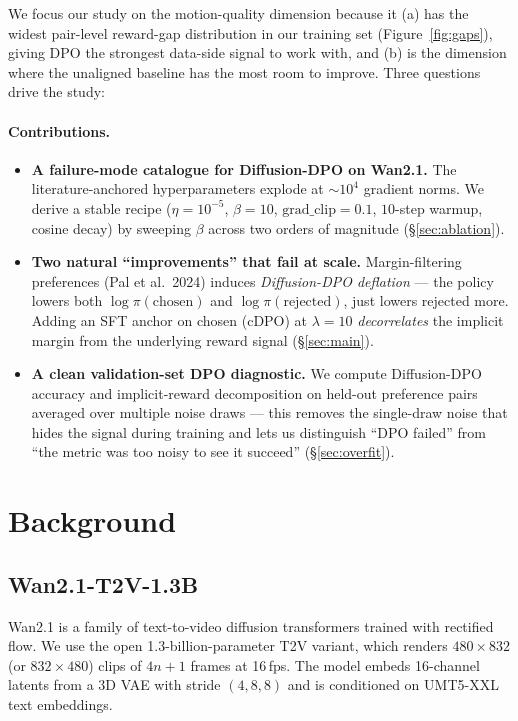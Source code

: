 \documentclass{article}
\begin{document}
We focus our study on the motion-quality dimension because it (a) has the widest pair-level reward-gap distribution in our training set (Figure~\ref{fig:gaps}), giving DPO the strongest data-side signal to work with, and (b) is the dimension where the unaligned baseline has the most room to improve.  Three questions drive the study:

\paragraph{Contributions.}
\begin{itemize}
\item \textbf{A failure-mode catalogue for Diffusion-DPO on Wan2.1.}  The literature-anchored hyperparameters explode at $\sim 10^4$ gradient norms.  We derive a stable recipe ($\eta{=}10^{-5}$, $\beta{=}10$, $\text{grad\_clip}{=}0.1$, $10$-step warmup, cosine decay) by sweeping $\beta$ across two orders of magnitude (\S\ref{sec:ablation}).
\item \textbf{Two natural ``improvements'' that fail at scale.}  Margin-filtering preferences (Pal et al.\ 2024) induces \emph{Diffusion-DPO deflation} --- the policy lowers both $\log\pi(\text{chosen})$ and $\log\pi(\text{rejected})$, just lowers rejected more.  Adding an SFT anchor on chosen (cDPO) at $\lambda{=}10$ \emph{decorrelates} the implicit margin from the underlying reward signal (\S\ref{sec:main}).
\item \textbf{A clean validation-set DPO diagnostic.}  We compute Diffusion-DPO accuracy and implicit-reward decomposition on held-out preference pairs averaged over multiple noise draws --- this removes the single-draw noise that hides the signal during training and lets us distinguish ``DPO failed'' from ``the metric was too noisy to see it succeed'' (\S\ref{sec:overfit}).
\end{itemize}

\section{Background}
\subsection{Wan2.1-T2V-1.3B}
Wan2.1 is a family of text-to-video diffusion transformers trained with rectified flow.  We use the open 1.3-billion-parameter T2V variant, which renders $480{\times}832$ (or $832{\times}480$) clips of $4n{+}1$ frames at 16\,fps.  The model embeds 16-channel latents from a 3D VAE with stride $(4,8,8)$ and is conditioned on UMT5-XXL text embeddings.
\end{document}
